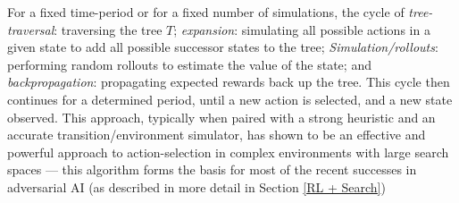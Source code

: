 \newline \newline
For a fixed time-period or for a fixed number of simulations, the cycle of \textit{tree-traversal}: traversing the tree $T$; \textit{expansion}: simulating all possible actions in a given state to add all possible successor states to the tree; \textit{Simulation/rollouts}: performing random rollouts to estimate the value of the state; and \textit{backpropagation}: propagating expected rewards back up the tree. This cycle then continues for a determined period, until a new action is selected, and a new state observed. 
\newline \newline
This approach, typically when paired with a strong heuristic and an accurate transition/environment simulator, has shown to be an effective and powerful approach to action-selection in complex environments with large search spaces --- this algorithm forms the basis for most of the recent successes in adversarial AI (as described in more detail in Section \ref{RL + Search}) 

